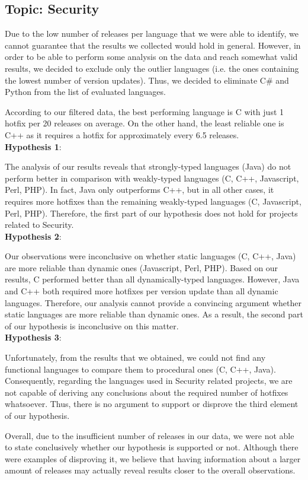 \subsection{Topic: Security}
Due to the low number of releases per language that we were able to identify, we cannot guarantee that the results we collected would hold in general. However, in order to be able to perform some analysis on the data and reach somewhat valid results, we decided to exclude only the outlier languages  (i.e. the ones containing the lowest number of version updates). Thus, we decided to eliminate C\# and Python from the list of evaluated languages.\par

According to our filtered data, the best performing language is C with just 1 hotfix per 20 releases on average. On the other hand, the least reliable one is C++ as it requires a hotfix for approximately every 6.5 releases.\\

\textbf{Hypothesis 1}:\par
The analysis of our results reveals that strongly-typed languages (Java) do not perform better in comparison with weakly-typed languages (C, C++, Javascript, Perl, PHP). In fact, Java only outperforms C++, but in all other cases, it requires more hotfixes than the remaining weakly-typed languages (C, Javascript, Perl, PHP). Therefore, the first part of our hypothesis does not hold for projects related to Security.\\

\textbf{Hypothesis 2}:\par
Our observations were inconclusive on whether static languages (C, C++, Java) are more reliable than dynamic ones (Javascript, Perl, PHP). Based on our results, C performed better than all dynamically-typed languages. However, Java and C++ both required more hotfixes per version update than all dynamic languages. Therefore, our analysis cannot provide a convincing argument whether static languages are more reliable than dynamic ones. As a result, the second part of our hypothesis is inconclusive on this matter.\\

\textbf{Hypothesis 3}:\par
Unfortunately, from the results that we obtained, we could not find any functional languages to compare them to procedural ones (C, C++, Java).
Consequently, regarding the languages used in Security related projects, we are not capable of deriving any conclusions about the required number of hotfixes whatsoever. Thus, there is no argument to support or disprove the third element of our hypothesis.\par
Overall, due to the insufficient number of releases in our data, we were not able to state conclusively whether our hypothesis is supported or not. Although there were examples of disproving it, we believe that having information about a larger amount of releases may actually reveal results closer to the overall observations.

